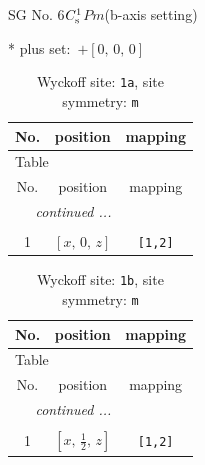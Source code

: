 \documentclass[fleqn,8pt]{jsarticle}
\begin{document}
\setcounter{MaxMatrixCols}{32}

\renewcommand{\tablename}{Table~}
\renewcommand{\figurename}{Figure~}
\begin{center}
\LARGE
SG No. 6\quad$C_{\rm s}^{1}$\quad$Pm$\quad(b-axis setting)\quad[ monoclinic ]
\end{center}
* plus set:\,\,\,$+\left[ 0,\, 0,\, 0 \right]$
\renewcommand{\arraystretch}{1.2}
\begin{longtable}{ccc}
\caption{Wyckoff site: {\tt 1a}, site symmetry: {\tt m}}
 \\
 \hline \hline
No. & position & mapping \\ \hline \endfirsthead

\multicolumn{2}{l}{\tablename\ \thetable{}} \\
 \hline \hline
No. & position & mapping \\ \hline \endhead

 \hline \hline
\multicolumn{2}{r}{\footnotesize\it continued ...} \\ \endfoot

 \hline \hline
\multicolumn{2}{r}{} \\ \endlastfoot

1 & $\left[ x,\, 0,\, z \right]$ & {\tt [1,2]} \\
\end{longtable}
\renewcommand{\arraystretch}{1.2}
\begin{longtable}{ccc}
\caption{Wyckoff site: {\tt 1b}, site symmetry: {\tt m}}
 \\
 \hline \hline
No. & position & mapping \\ \hline \endfirsthead

\multicolumn{2}{l}{\tablename\ \thetable{}} \\
 \hline \hline
No. & position & mapping \\ \hline \endhead

 \hline \hline
\multicolumn{2}{r}{\footnotesize\it continued ...} \\ \endfoot

 \hline \hline
\multicolumn{2}{r}{} \\ \endlastfoot

1 & $\left[ x,\, \frac{1}{2},\, z \right]$ & {\tt [1,2]} \\
\end{longtable}
\renewcommand{\arraystretch}{1.2}
\end{document}
